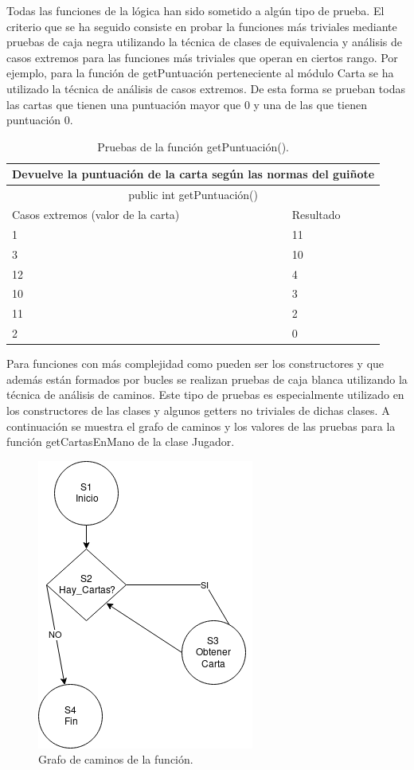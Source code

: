 Todas las funciones de la lógica han sido sometido a algún tipo de prueba. El criterio que se ha seguido consiste en probar la funciones más triviales mediante pruebas de caja negra utilizando la técnica de clases de equivalencia y análisis de casos extremos para las funciones más triviales que operan en ciertos rango. 
Por ejemplo, para la función de getPuntuación perteneciente al módulo Carta se ha utilizado la técnica de análisis de casos extremos. De esta forma se prueban todas las cartas que tienen una puntuación mayor que 0 y una de las que tienen puntuación 0.

\begin{table}[htb]
\centering
\begin{tabular}{|l|l|}
\hline
\multicolumn{2}{|c|}{Devuelve la puntuación de la carta según las normas del guiñote} \\ \hline
\multicolumn{2}{|c|}{public int getPuntuación()} \\ \hline
Casos extremos (valor de la carta) & Resultado \\ \hline
   	1 & 11 \\ \hline
	3 & 10 \\ \hline
	12 & 4 \\ \hline
	10 & 3 \\ \hline
	11 & 2 \\ \hline
	2 & 0 \\ \hline
 \end{tabular}
 \caption{Pruebas de la función getPuntuación().}
\label{}
\end{table}

Para funciones con más complejidad como pueden ser los constructores y que además están formados por bucles se realizan pruebas de caja blanca utilizando la técnica de análisis de caminos. Este tipo de pruebas es especialmente utilizado en los constructores de las clases y algunos getters no triviales de dichas clases. 
A continuación se muestra el grafo de caminos y los valores de las pruebas para la función getCartasEnMano de la clase Jugador.

\begin{figure}[H]
		\centering
		\includegraphics[scale=0.8]{figuras/getCartas.png}
		\caption{Grafo de caminos de la función.}
	\end{figure}

